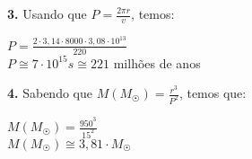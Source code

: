 \documentclass[12pt,letterpaper]{article}
\begin{document}
		\textbf{3.} Usando que $P = \frac{2\pi r}{v}$, temos:
		
		\begin{center}
			$P = \frac{2\cdot 3,14\cdot 8000 \cdot 3,08 \cdot 10^{13}}{220}$\\
			$P \cong 7\cdot 10^{15} s \cong 221$ milhões de anos 
		\end{center} 
        
        \textbf{4.} Sabendo que $M(M_{\astrosun}) = \frac{r^3}{P^2}$, temos que:
        
        \begin{center}
        	$M(M_{\astrosun}) = \frac{950^3}{15^2}$\\
        	$M(M_{\astrosun}) \cong 3,81 \cdot M_{\astrosun}$        	
        \end{center}
			 
\end{document}
